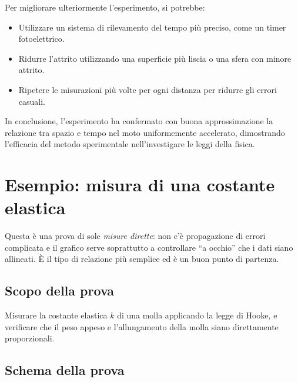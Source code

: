 Per migliorare ulteriormente l'esperimento, si potrebbe:
\begin{itemize}
    \item Utilizzare un sistema di rilevamento del tempo più preciso, come un timer fotoelettrico.
    \item Ridurre l'attrito utilizzando una superficie più liscia o una sfera con minore attrito.
    \item Ripetere le misurazioni più volte per ogni distanza per ridurre gli errori casuali.
\end{itemize}

In conclusione, l'esperimento ha confermato con buona approssimazione la relazione tra spazio e tempo nel moto uniformemente accelerato, dimostrando l'efficacia del metodo sperimentale nell'investigare le leggi della fisica.



\newpage
\section[Esempio: legge di Hooke]{Esempio: misura di una costante elastica}

Questa è una prova di sole \emph{misure dirette}: non c'è propagazione di errori complicata e il grafico serve soprattutto a controllare ``a occhio'' che i dati siano allineati. È il tipo di relazione più semplice ed è un buon punto di partenza.

\subsection{Scopo della prova}
Misurare la costante elastica $k$ di una molla applicando la legge di Hooke, e verificare che il peso appeso e l'allungamento della molla siano direttamente proporzionali.

\subsection{Schema della prova}

